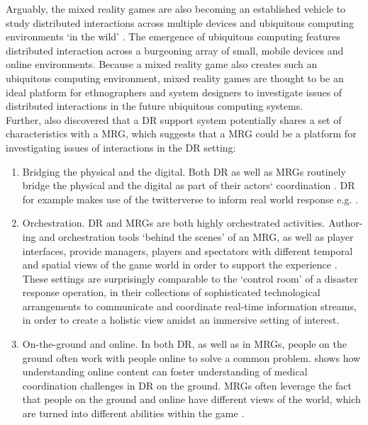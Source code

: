 Arguably, the mixed reality games are also becoming an established vehicle to study distributed interactions across multiple devices and ubiquitous computing environments `in the wild' \citep{Crabtree2006, Benford2005, Fischer2012}. The emergence of ubiquitous computing features distributed interaction across a burgeoning array of small, mobile devices and online environments. Because a mixed reality game also creates such an ubiquitous computing environment,  mixed reality games are thought to be an ideal platform for ethnographers and system designers to investigate issues of distributed interactions in the future ubiquitous computing systems.\\

Further, \cite{Fischer2012} also discovered that a \ac{DR} support system potentially shares a set of characteristics with a \ac{MRG}, which suggests that a \ac{MRG} could be a platform for investigating issues of interactions in the \ac{DR} setting:\\

\begin{enumerate}
\item Bridging the physical and the digital. Both \ac{DR} as well as \ac{MRG}s routinely bridge the physical and the digital as part of their actors` coordination \citep{Benford2005}. \ac{DR} for example makes use of the twitterverse to inform real world response e.g. \citep{Sarcevic2012}.

\item Orchestration. \ac{DR} and \ac{MRG}s are both highly orchestrated activities. Author-ing and orchestration tools `behind the scenes' of an \ac{MRG}, as well as player interfaces, provide managers, players and spectators with different temporal and spatial views of the game world in order to support the experience \citep{Crabtree2004}. These settings are surprisingly comparable to the `control room' of a disaster response operation, in their collections of sophisticated technological arrangements to communicate and coordinate real-time information streams, in order to create a holistic view amidst an immersive setting of interest.\\

\item On-the-ground and online. In both \ac{DR}, as well as in \ac{MRG}s, people on the ground often work with people online to solve a common problem. \cite{Sarcevic2012} shows how understanding online content can foster understanding of medical coordination challenges in \ac{DR} on the ground. \ac{MRG}s often leverage the fact that people on the ground and online have different views of the world, which are turned into different abilities within the game \citep{Flintham2003}.\\ 

\end{enumerate}

